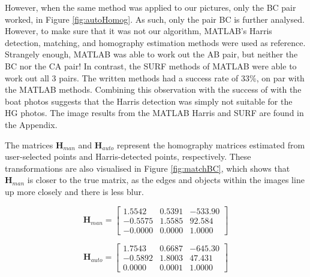 \documentclass[a4paper, 10pt, conference]{ieeeconf}
\begin{document}
However, when the same method was applied to our pictures, only the BC pair worked, in Figure \ref{fig:autoHomog}. As such, only the pair BC is further analysed. However, to make sure that it was not our algorithm, MATLAB's Harris detection, matching, and homography estimation methods were used as reference. Strangely enough, MATLAB was able to work out the AB pair, but neither the BC nor the CA pair! In contrast, the SURF methods of MATLAB were able to work out all 3 pairs. The written methods had a success rate of 33\%, on par with the MATLAB methods. Combining this observation with the success of with the boat photos suggests that the Harris detection was simply not suitable for the HG photos. The image results from the MATLAB Harris and SURF are found in the Appendix.


The matrices $\textbf{H}_{man}$ and $\textbf{H}_{auto}$ represent the homography matrices estimated from user-selected points and Harris-detected points, respectively. These transformations are also visualised in Figure \ref{fig:matchBC}, which shows that $\textbf{H}_{man}$ is closer to the true matrix, as the edges and objects within the images line up more closely and there is less blur.


\begin{equation} \label{eqn:manHomog}
\textbf{H}_{man} = \begin{bmatrix}
     1.5542 &  0.5391 & -533.90 \\
    -0.5575 &  1.5585 &  92.584 \\
    -0.0000 &  0.0000 &  1.0000
\end{bmatrix}
\end{equation}

\begin{equation} \label{eqn:autoHomog}
\textbf{H}_{auto} = \begin{bmatrix}
     1.7543 &  0.6687 & -645.30 \\
    -0.5892 &  1.8003 &  47.431 \\
     0.0000 &  0.0001 &  1.0000
\end{bmatrix}
\end{equation}
\end{document}

